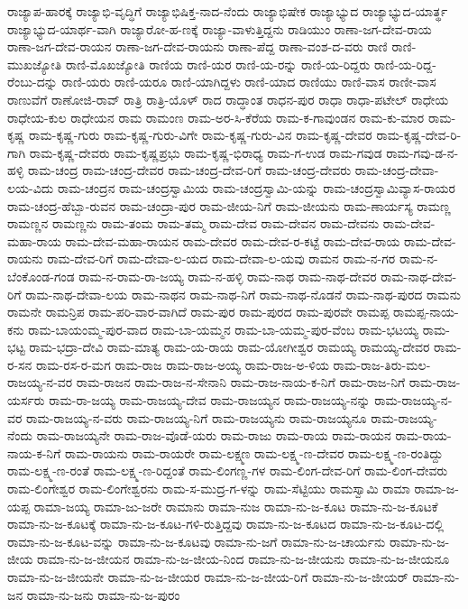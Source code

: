 ರಾಜ್ಯಾಪ-ಹಾರಕ್ಕೆ
ರಾಜ್ಯಾಭಿ-ವೃದ್ಧಿಗೆ
ರಾಜ್ಯಾಭಿಷಿಕ್ತ-ನಾದ-ನೆಂದು
ರಾಜ್ಯಾಭಿಷೇಕ
ರಾಜ್ಯಾಭ್ಯುದ
ರಾಜ್ಯಾಭ್ಯುದ-ಯಾರ್ತ್ಥ
ರಾಜ್ಯಾಭ್ಯುದ-ಯಾರ್ಥ-ವಾಗಿ
ರಾಜ್ಯಾರೋ-ಹ-ಣಕ್ಕೆ
ರಾಜ್ಯಾ-ವಾಳುತ್ತಿದ್ದನು
ರಾಡಿಯುಂ
ರಾಣಾ-ಜಗ-ದೇವ-ರಾಯ
ರಾಣಾ-ಜಗ-ದೇವ-ರಾಯನ
ರಾಣಾ-ಜಗ-ದೇವ-ರಾಯನು
ರಾಣಾ-ಪೆದ್ದ
ರಾಣಾ-ವಂಶ-ದ-ವರು
ರಾಣಿ
ರಾಣಿ-ಮುಖಜ್ಯೋತಿ
ರಾಣಿ-ಮೊಖಜ್ಯೋತಿ
ರಾಣಿಯ
ರಾಣಿ-ಯರ
ರಾಣಿ-ಯ-ರನ್ನು
ರಾಣಿ-ಯ-ರಿದ್ದರು
ರಾಣಿ-ಯ-ರಿದ್ದ-ರೆಂಬು-ದನ್ನು
ರಾಣಿ-ಯರು
ರಾಣಿ-ಯರೂ
ರಾಣಿ-ಯಾಗಿದ್ದಳು
ರಾಣಿ-ಯಾದ
ರಾಣಿಯು
ರಾಣಿ-ವಾಸ
ರಾಣೀ-ವಾಸ
ರಾಣುವೆಗೆ
ರಾಣೋಜಿ-ರಾವ್
ರಾತ್ರಿ
ರಾತ್ರಿ-ಯೊಳ್
ರಾದ
ರಾದ್ಧಾಂತ
ರಾಧನ-ಪುರ
ರಾಧಾ
ರಾಧಾ-ಪಟೇಲ್
ರಾಧೇಯ
ರಾಧೇಯ-ಕುಲ
ರಾಧೇಯನ
ರಾಮ
ರಾಮಂಣ
ರಾಮ-ಅರ-ಸಿ-ಕೆರೆಯ
ರಾಮ-ಕ-ಗಾವುಂಡನ
ರಾಮ-ಕು-ಮಾರ
ರಾಮ-ಕೃಷ್ಣ
ರಾಮ-ಕೃಷ್ಣ-ಗುರು
ರಾಮ-ಕೃಷ್ಣ-ಗುರು-ವಿಗೇ
ರಾಮ-ಕೃಷ್ಣ-ಗುರು-ವಿನ
ರಾಮ-ಕೃಷ್ಣ-ದೇವರ
ರಾಮ-ಕೃಷ್ಣ-ದೇವ-ರಿ-ಗಾಗಿ
ರಾಮ-ಕೃಷ್ಣ-ದೇವರು
ರಾಮ-ಕೃಷ್ಣಪ್ರಭು
ರಾಮ-ಕೃಷ್ಣ-ಭಿರಾಧ್ಯ
ರಾಮ-ಗ-ಉಡ
ರಾಮ-ಗವುಡ
ರಾಮ-ಗವು-ಡ-ನ-ಹಳ್ಳಿ
ರಾಮ-ಚಂದ್ರ
ರಾಮ-ಚಂದ್ರ-ದೇವರ
ರಾಮ-ಚಂದ್ರ-ದೇವ-ರಿಗೆ
ರಾಮ-ಚಂದ್ರ-ದೇವರು
ರಾಮ-ಚಂದ್ರ-ದೇವಾ-ಲಯ-ವಿದು
ರಾಮ-ಚಂದ್ರನ
ರಾಮ-ಚಂದ್ರಸ್ವಾಮಿಯ
ರಾಮ-ಚಂದ್ರಸ್ವಾಮಿ-ಯನ್ನು
ರಾಮ-ಚಂದ್ರಸ್ವಾಮಿವ್ಯಾಸ-ರಾಯರ
ರಾಮ-ಚಂದ್ರ-ಹೆಬ್ಬಾ-ರುವನ
ರಾಮ-ಚಂದ್ರಾ-ಪುರ
ರಾಮ-ಜೀಯ-ನಿಗೆ
ರಾಮ-ಜೀಯನು
ರಾಮ-ಣಾರ್ಯಸ್ಯ
ರಾಮಣ್ಣ
ರಾಮಣ್ಣನ
ರಾಮಣ್ಣನು
ರಾಮ-ತಂಮ
ರಾಮ-ತಮ್ಮ
ರಾಮ-ದೇವ
ರಾಮ-ದೇವನ
ರಾಮ-ದೇವನು
ರಾಮ-ದೇವ-ಮಹಾ-ರಾಯ
ರಾಮ-ದೇವ-ಮಹಾ-ರಾಯನ
ರಾಮ-ದೇವರ
ರಾಮ-ದೇವ-ರ-ಕಟ್ಟೆ
ರಾಮ-ದೇವ-ರಾಯ
ರಾಮ-ದೇವ-ರಾಯನು
ರಾಮ-ದೇವ-ರಿಗೆ
ರಾಮ-ದೇವಾ-ಲ-ಯದ
ರಾಮ-ದೇವಾ-ಲ-ಯವು
ರಾಮನ
ರಾಮ-ನ-ಗರ
ರಾಮ-ನ-ಬೆಂಕೊಂಡ-ಗಂಡ
ರಾಮ-ನ-ರಾಮ-ರಾ-ಜಯ್ಯ
ರಾಮ-ನ-ಹಳ್ಳಿ
ರಾಮ-ನಾಥ
ರಾಮ-ನಾಥ-ದೇವರ
ರಾಮ-ನಾಥ-ದೇವ-ರಿಗೆ
ರಾಮ-ನಾಥ-ದೇವಾ-ಲಯ
ರಾಮ-ನಾಥನ
ರಾಮ-ನಾಥ-ನಿಗೆ
ರಾಮ-ನಾಥ-ನೊಡನೆ
ರಾಮ-ನಾಥ-ಪುರದ
ರಾಮನು
ರಾಮನೇ
ರಾಮನ್ರಿಪ
ರಾಮ-ಪರಿ-ವಾರ-ವಾಗಿದೆ
ರಾಮ-ಪುರ
ರಾಮ-ಪುರದ
ರಾಮ-ಪುರವೇ
ರಾಮಪ್ಪ
ರಾಮಪ್ಪ-ನಾಯ-ಕನು
ರಾಮ-ಬಾಯಂಮ್ಮ-ಪುರ-ವಾದ
ರಾಮ-ಬಾ-ಯಮ್ಮನ
ರಾಮ-ಬಾ-ಯಮ್ಮ-ಪುರ-ವೆಂಬ
ರಾಮ-ಭಟಯ್ಯ
ರಾಮ-ಭಟ್ಟ
ರಾಮ-ಭದ್ರಾ-ದೇವಿ
ರಾಮ-ಮಾತ್ಯ
ರಾಮ-ಯ-ರಾಯ
ರಾಮ-ಯೋಗೀಶ್ವರ
ರಾಮಯ್ಯ
ರಾಮಯ್ಯ-ದೇವರ
ರಾಮ-ರ-ಸನ
ರಾಮ-ರಸ-ರ-ಮಗ
ರಾಮ-ರಾಜ
ರಾಮ-ರಾಜ-ಅಯ್ಯ
ರಾಮ-ರಾಜ-ಅ-ಳಿಯ
ರಾಮ-ರಾಜ-ತಿರು-ಮಲ-ರಾಜಯ್ಯ-ನ-ವರ
ರಾಮ-ರಾಜನ
ರಾಮ-ರಾಜ-ನ-ಸೇನಾನಿ
ರಾಮ-ರಾಜ-ನಾಯ-ಕ-ನಿಗೆ
ರಾಮ-ರಾಜ-ನಿಗೆ
ರಾಮ-ರಾಜ-ಯರ್ಸರು
ರಾಮ-ರಾ-ಜಯ್ಯ
ರಾಮ-ರಾಜಯ್ಯ-ದೇವ
ರಾಮ-ರಾಜಯ್ಯನ
ರಾಮ-ರಾಜಯ್ಯ-ನನ್ನು
ರಾಮ-ರಾಜಯ್ಯ-ನ-ವರ
ರಾಮ-ರಾಜಯ್ಯ-ನ-ವರು
ರಾಮ-ರಾಜಯ್ಯ-ನಿಗೆ
ರಾಮ-ರಾಜಯ್ಯನು
ರಾಮ-ರಾಜಯ್ಯನೂ
ರಾಮ-ರಾಜಯ್ಯ-ನೆಂದು
ರಾಮ-ರಾಜಯ್ಯನೇ
ರಾಮ-ರಾಜ-ವೊಡೆ-ಯರು
ರಾಮ-ರಾಜು
ರಾಮ-ರಾಯ
ರಾಮ-ರಾಯನ
ರಾಮ-ರಾಯ-ನಾಯ-ಕ-ನಿಗೆ
ರಾಮ-ರಾಯನು
ರಾಮ-ರಾಯರೇ
ರಾಮ-ಲಕ್ಷ್ಮಣ
ರಾಮ-ಲಕ್ಷ್ಮ-ಣ-ದೇವರ
ರಾಮ-ಲಕ್ಷ್ಮ-ಣ-ರಂತಿದ್ದು
ರಾಮ-ಲಕ್ಷ್ಮ-ಣ-ರಂತೆ
ರಾಮ-ಲಕ್ಷ್ಮ-ಣ-ರಿದ್ದಂತೆ
ರಾಮ-ಲಿಂಗಣ್ಣ-ಗಳ
ರಾಮ-ಲಿಂಗ-ದೇವ-ರಿಗೆ
ರಾಮ-ಲಿಂಗ-ದೇವರು
ರಾಮ-ಲಿಂಗೇಶ್ವರ
ರಾಮ-ಲಿಂಗೇಶ್ವರನು
ರಾಮ-ಸ-ಮುದ್ರ-ಗ-ಳನ್ನು
ರಾಮ-ಸೆಟ್ಟಿಯು
ರಾಮಸ್ವಾಮಿ
ರಾಮಾ
ರಾಮಾ-ಜ-ಯಪ್ಪ
ರಾಮಾ-ಜಯ್ಯ
ರಾಮಾ-ಜು-ಜರೇ
ರಾಮಾನು
ರಾಮಾ-ನುಜ
ರಾಮಾ-ನು-ಜ-ಕೂಟ
ರಾಮಾ-ನು-ಜ-ಕೂಟಕೆ
ರಾಮಾ-ನು-ಜ-ಕೂಟಕ್ಕೆ
ರಾಮಾ-ನು-ಜ-ಕೂಟ-ಗಳಿ-ರುತ್ತಿದ್ದವು
ರಾಮಾ-ನು-ಜ-ಕೂಟದ
ರಾಮಾ-ನು-ಜ-ಕೂಟ-ದಲ್ಲಿ
ರಾಮಾ-ನು-ಜ-ಕೂಟ-ವನ್ನು
ರಾಮಾ-ನು-ಜ-ಕೂಟವು
ರಾಮಾ-ನು-ಜಗೆ
ರಾಮಾ-ನು-ಜ-ಚಾರ್ಯನು
ರಾಮಾ-ನು-ಜ-ಜೀಯ
ರಾಮಾ-ನು-ಜ-ಜೀಯನ
ರಾಮಾ-ನು-ಜ-ಜೀಯ-ನಿಂದ
ರಾಮಾ-ನು-ಜ-ಜೀಯನು
ರಾಮಾ-ನು-ಜ-ಜೀಯನೂ
ರಾಮಾ-ನು-ಜ-ಜೀಯನೇ
ರಾಮಾ-ನು-ಜ-ಜೀಯರ
ರಾಮಾ-ನು-ಜ-ಜೀಯ-ರಿಗೆ
ರಾಮಾ-ನು-ಜ-ಜೀಯರ್
ರಾಮಾ-ನು-ಜನ
ರಾಮಾ-ನು-ಜನು
ರಾಮಾ-ನು-ಜ-ಪುರಂ

